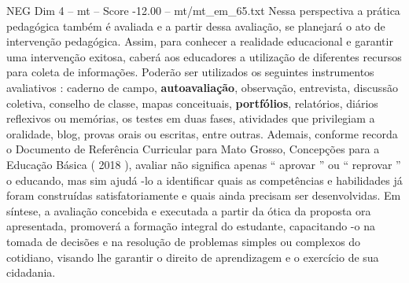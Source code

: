\begin{textsample}{NEG Dim 4 – mt – Score -12.00 – mt/mt\_em\_65.txt}
Nessa perspectiva a prática pedagógica também é avaliada e a partir dessa avaliação, se planejará o ato de intervenção pedagógica.
Assim, para conhecer a realidade educacional e garantir uma intervenção exitosa, caberá aos educadores a utilização de diferentes recursos para coleta de informações.
Poderão ser utilizados os seguintes instrumentos avaliativos : caderno de campo, \textbf{autoavaliação}, observação, entrevista, discussão coletiva, conselho de classe, mapas conceituais, \textbf{portfólios}, relatórios, diários reflexivos ou memórias, os testes em duas fases, atividades que privilegiam a oralidade, blog, provas orais ou escritas, entre outras.
Ademais, conforme recorda o Documento de Referência Curricular para Mato Grosso, Concepções para a Educação Básica ( 2018 ), avaliar não significa apenas “ aprovar ” ou “ reprovar ” o educando, mas sim ajudá -lo a identificar quais as competências e habilidades já foram construídas satisfatoriamente e quais ainda precisam ser desenvolvidas.
Em síntese, a avaliação concebida e executada a partir da ótica da proposta ora apresentada, promoverá a formação integral do estudante, capacitando -o na tomada de decisões e na resolução de problemas simples ou complexos do cotidiano, visando lhe garantir o direito de aprendizagem e o exercício de sua cidadania.

\end{textsample}

